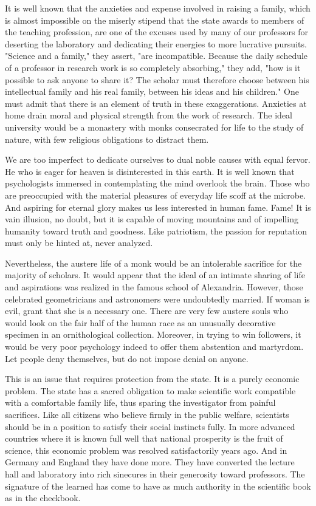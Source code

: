 \documentclass{article}
\begin{document}
It is well known that the anxieties and expense involved in raising a family, which is almost impossible on the miserly stipend that the state awards to members of the teaching profession, are one of the excuses used by many of our professors for deserting the laboratory and dedicating their energies to more lucrative pursuits. "Science and a family," they assert, "are incompatible. Because the daily schedule of a professor in research work is so completely absorbing," they add, "how is it possible to ask anyone to share it? The scholar must therefore choose between his intellectual family and his real family, between his ideas and his children." One must admit that there is an element of truth in these exaggerations. Anxieties at home drain moral and physical strength from the work of research. The ideal university would be a monastery with monks consecrated for life to the study of nature, with few religious obligations to distract them.

We are too imperfect to dedicate ourselves to dual noble causes with equal fervor. He who is eager for heaven is disinterested in this earth. It is well known that psychologists immersed in contemplating the mind overlook the brain. Those who are preoccupied with the material pleasures of everyday life scoff at the microbe. And aspiring for eternal glory makes us less interested in human fame. Fame! It is vain illusion, no doubt, but it is capable of moving mountains and of impelling humanity toward truth and goodness. Like patriotism, the passion for reputation must only be hinted at, never analyzed.

Nevertheless, the austere life of a monk would be an intolerable sacrifice for the majority of scholars. It would appear that the ideal of an intimate sharing of life and aspirations was realized in the famous school of Alexandria. However, those celebrated geometricians and astronomers were undoubtedly married. If woman is evil, grant that she is a necessary one. There are very few austere souls who would look on the fair half of the human race as an unusually decorative specimen in an ornithological collection. Moreover, in trying to win followers, it would be very poor psychology indeed to offer them abstention and martyrdom. Let people deny themselves, but do not impose denial on anyone.

This is an issue that requires protection from the state. It is a purely economic problem. The state has a sacred obligation to make scientific work compatible with a comfortable family life, thus sparing the investigator from painful sacrifices. Like all citizens who believe firmly in the public welfare, scientists should be in a position to satisfy their social instincts fully. In more advanced countries where it is known full well that national prosperity is the fruit of science, this economic problem was resolved satisfactorily years ago. And in Germany and England they have done more. They have converted the lecture hall and laboratory into rich sinecures in their generosity toward professors. The signature of the learned has come to have as much authority in the scientific book as in the checkbook.
\end{document}
